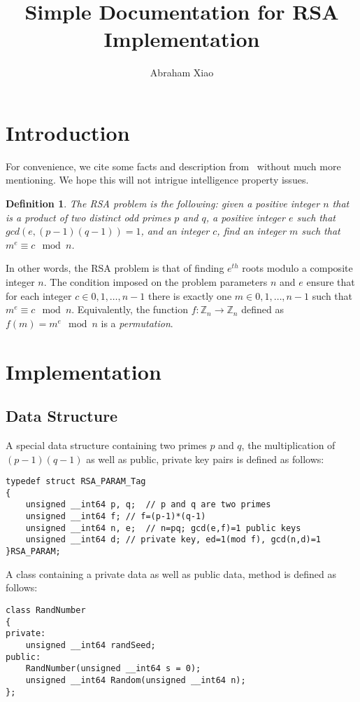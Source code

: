 \documentclass[12pt]{article}
\newtheorem{Definition}{Definition}
\begin{document}
\title{Simple Documentation for RSA Implementation}
\author{Abraham Xiao}
\maketitle

\section{Introduction}
\label{sec:introduction}

For convenience, we cite some facts and description
from~\cite{Menezes:1996:HAC:548089} without much more mentioning. We
hope this will not intrigue intelligence property issues. 
\par
\begin{Definition}
  The \emph{RSA problem} is the following: given a positive integer
  $n$ that is a product of two distinct odd primes $p$ and $q$, a
  positive integer $e$ such that $gcd(e,(p-1)(q-1))=1$, and an integer
  $c$, find an integer $m$ such that $m^{e}\equiv c\mod n$.
\end{Definition}
In other words, the RSA problem is that of finding $e^{th}$ roots
modulo a composite integer $n$. The condition imposed on the problem
parameters $n$ and $e$ ensure that for each integer
$c\in{0,1,\ldots,n-1}$ there is exactly one $m\in{0,1,\ldots,n-1}$
such that $m^{e}\equiv c\mod n$. Equivalently, the function
$f:\mathbb{Z}_{n}\longrightarrow\mathbb{Z}_{n}$ defined as
$f(m)=m^{e}\mod n$ is a \emph{permutation}.

\section{Implementation}
\label{sec:implementation}

\subsection{Data Structure}
\label{sec:data-structure}

A special data structure containing two primes $p$ and $q$, the
multiplication of $(p-1)(q-1)$ as well as public, private key pairs is
defined as follows:
\begin{verbatim}
typedef struct RSA_PARAM_Tag
{
	unsigned __int64 p, q;  // p and q are two primes
	unsigned __int64 f;	// f=(p-1)*(q-1)
	unsigned __int64 n, e;	// n=pq; gcd(e,f)=1 public keys
	unsigned __int64 d;	// private key, ed=1(mod f), gcd(n,d)=1
}RSA_PARAM;
\end{verbatim}
A class containing a private data as well as public data, method is
defined as follows:
\begin{verbatim}
class RandNumber
{
private:
	unsigned __int64 randSeed;
public:
	RandNumber(unsigned __int64 s = 0);
	unsigned __int64 Random(unsigned __int64 n);
};
\end{verbatim}
\end{document}
